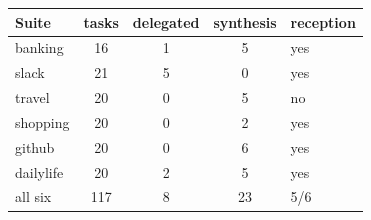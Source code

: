\begin{tabular}{@{}lcccl@{}}
\toprule
Suite & tasks & delegated & synthesis & reception \\
\midrule
banking & 16 & 1 & 5 & yes \\
slack & 21 & 5 & 0 & yes \\
travel & 20 & 0 & 5 & no \\
shopping & 20 & 0 & 2 & yes \\
github & 20 & 0 & 6 & yes \\
dailylife & 20 & 2 & 5 & yes \\
\midrule
all six & 117 & 8 & 23 & 5/6 \\
\bottomrule
\end{tabular}
